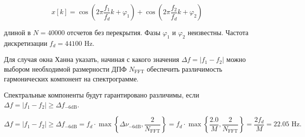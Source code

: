\begin{equation*}
x[k] = \cos\left(2\pi\dfrac{f_1}{f_d}k + \varphi_1\right) +
\cos\left(2\pi\dfrac{f_2}{f_d}k + \varphi_2\right)
\end{equation*}

длиной в $N = 40000$ отсчетов без перекрытия. Фазы $\varphi_1$ и $\varphi_2$ неизвестны. Частота дискретизации $f_d = 44100 $ Hz.

Для случая окна Ханна указать, начиная с какого значения $\Delta f = |f_1 - f_2|$ можно выбором необходимой размерности ДПФ $N_{\text{FFT}}$ обеспечить различимость гармонических компонент на спектрограмме.

Спектральные компоненты будут гарантировано различимы, если $\Delta f = |f_1 - f_2| \geq \Delta f_{-6\text{dB}}$.

\begin{equation*}
\Delta f = |f_1 - f_2| \geq \Delta f_{-6\text{dB}} = f_d \cdot \max \left\{\Delta \nu_{-6\text{dB}}, \dfrac{2}{N_{\text{FFT}}}\right\} =
f_d \cdot \max\left\{\dfrac{2.0}{M}, \dfrac{2}{N_{\text{FFT}}}\right\} = \dfrac{2f_d}{M} = 22.05\text{ Hz}.
\end{equation*}
